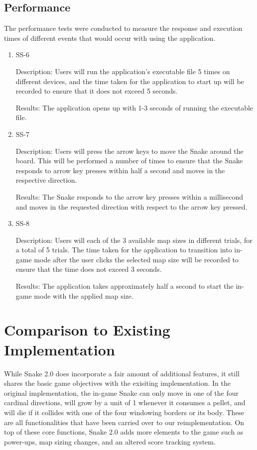 \documentclass[12pt, titlepage]{article}
\begin{document}
\subsection{Performance}
The performance tests were conducted to measure the response and execution times of different events that would occur with using the application.

\begin{enumerate}				
\item SS-6
\label{nfr:ss-6}

Description: Users will run the application's executable file 5 times on different devices, and the time taken for the application to start up will be recorded to ensure that it does not exceed 5 seconds.

Results: The application opens up with 1-3 seconds of running the executable file.

\item SS-7
\label{nfr:ss-7}

Description: Users will press the arrow keys to move the Snake around the board. This will be performed a number of times to ensure that the Snake responds to arrow key presses within half a second and moves in the respective direction.

Results: The Snake responds to the arrow key presses within a millisecond and moves in the requested direction with respect to the arrow key pressed.

\item SS-8
\label{nfr:ss-8}

Description: Users will each of the 3 available map sizes in different trials, for a total of 5 trials. The time taken for the application to transition into in-game mode after the user clicks the selected map size will be recorded to ensure that the time does not exceed 3 seconds.

Results: The application takes approximately half a second to start the in-game mode with the applied map size.

\end{enumerate}
	
\section{Comparison to Existing Implementation}	
While Snake 2.0 does incorporate a fair amount of additional features, it still shares the basic game objectives with the exisiting implementation. In the original implementation, the in-game Snake can only move in one of the four cardinal directions, will grow by a unit of 1 whenever it consumes a pellet, and will die if it collides with one of the four windowing borders or its body. These are all functionalities that have been carried over to our reimplementation. On top of these  core functions, Snake 2.0 adds more elements to the game such as power-ups, map sizing changes, and an altered score tracking system. 
\end{document}
